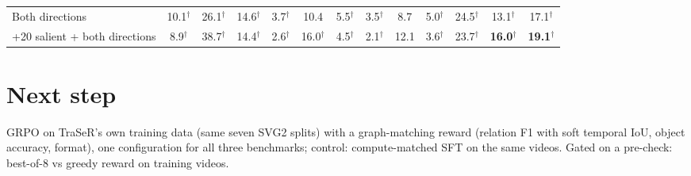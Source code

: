 \documentclass[11pt,a4paper]{article}
\begin{document}
\begin{table}[H]
\begin{tabular}{l ccc ccc ccc ccc}
\midrule
Both directions & 10.1$^\dagger$ & 26.1$^\dagger$ & 14.6$^\dagger$ & 3.7$^\dagger$ & 10.4 & 5.5$^\dagger$ & 3.5$^\dagger$ & 8.7 & 5.0$^\dagger$ & 24.5$^\dagger$ & 13.1$^\dagger$ & 17.1$^\dagger$ \\
+20 salient + both directions & 8.9$^\dagger$ & 38.7$^\dagger$ & 14.4$^\dagger$ & 2.6$^\dagger$ & 16.0$^\dagger$ & 4.5$^\dagger$ & 2.1$^\dagger$ & 12.1 & 3.6$^\dagger$ & 23.7$^\dagger$ & \textbf{16.0}$^\dagger$ & \textbf{19.1}$^\dagger$ \\
\bottomrule
\end{tabular}
\end{table}

\section{Next step}
GRPO on TraSeR's own training data (same seven SVG2 splits) with a graph-matching reward (relation F1 with soft temporal IoU,
object accuracy, format), one configuration for all three benchmarks; control: compute-matched SFT on the same videos. Gated on a
pre-check: best-of-8 vs greedy reward on training videos.
\end{document}
